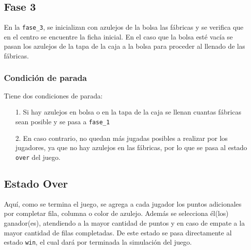\documentclass[12pt]{article}
\begin{document}
	\subsection*{Fase 3}
	En la \texttt{fase\_3}, se inicializan con azulejos de la bolsa las f\'abricas y se verifica que en el centro se encuentre la ficha inicial. En el caso que la bolsa est\'e vac\'ia se pasan los azulejos de la tapa de la caja a la bolsa para proceder al llenado de las f\'abricas.
	
	\subsubsection*{Condici\'on de parada}
	Tiene dos condiciones de parada:
	\begin{itemize}
		\item [1.] Si hay azulejos en bolsa o en la tapa de la caja se llenan cuantas f\'abricas sean posible y se pasa a \texttt{fase\_1} 
		\item [2.] En caso contrario, no quedan m\'as jugadas posibles a realizar por los jugadores, ya que no hay azulejos en las f\'abricas, por lo que se pasa al estado \texttt{over} del juego.	
		
	\end{itemize}

\subsection*{Estado Over}
Aqu\'i, como se termina el juego, se agrega a cada jugador los puntos adicionales por completar fila, columna o color de azulejo. Adem\'as se selecciona \'el(los) ganador(es), atendiendo a la mayor cantidad de puntos y en caso de empate a la mayor cantidad de filas completadas. De este estado se pasa directamente al estado \texttt{win}, el cual dar\'a por terminada la simulaci\'on del juego.
	
	
\end{document}
